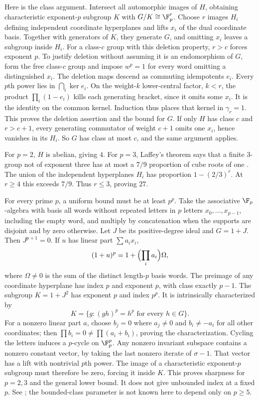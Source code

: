 Here is the class argument. Intersect all automorphic images
of \(H\), obtaining characteristic exponent-\(p\) subgroup
\(K\) with \(G/K\cong\F_p^r\).
Choose \(r\) images \(H_i\) defining independent coordinate
hyperplanes and lifts \(x_i\) of the dual coordinate basis.
Together with generators of \(K\), they generate \(G\), and
omitting \(x_i\) leaves a subgroup inside \(H_i\).
For a class-\(c\) group with this deletion property, \(r>c\)
forces exponent \(p\).
To justify deletion without assuming it is an endomorphism
of \(G\), form the free class-\(c\) group and impose \(w^p=1\)
for every word omitting a distinguished \(x_i\).
The deletion maps descend as commuting idempotents \(e_i\).
Every \(p\)th power lies in \(\bigcap_i\ker e_i\).
On the weight-\(k\) lower-central factor, \(k<r\), the product
\(\prod_i(1-e_i)\) kills each generating bracket, since it
omits some \(x_i\). It is the identity on the common kernel.
Induction thus places that kernel in \(\gamma_r=1\).
This proves the deletion assertion and the bound for \(G\).
If only \(H\) has class \(c\) and \(r>c+1\), every generating
commutator of weight \(c+1\) omits one \(x_i\), hence vanishes
in its \(H_i\). So \(G\) has class at most \(c\), and the same
argument applies.

For \(p=2\), \(H\) is abelian, giving \(4\).
For \(p=3\), Laffey's theorem says that a finite 3-group not
of exponent three has at most a \(7/9\) proportion of cube roots
of one \cite{laffey}.
The union of the independent hyperplanes \(H_i\) has proportion
\(1-(2/3)^r\). At \(r\ge4\) this exceeds \(7/9\).
Thus \(r\le3\), proving \(27\).

For every prime \(p\), a uniform bound must be at least \(p^p\).
Take the associative \(\F_p\)-algebra with basis all words
without repeated letters in \(p\) letters \(x_0,\ldots,x_{p-1}\),
including the empty word, and multiply by concatenation when
the supports are disjoint and by zero otherwise.
Let \(J\) be its positive-degree ideal and \(G=1+J\).
Then \(J^{p+1}=0\). If \(u\) has linear part \(\sum a_ix_i\),
\[
 (1+u)^p=1+\Bigl(\prod_i a_i\Bigr)\Omega,
\]
where \(\Omega\ne0\) is the sum of the distinct length-\(p\)
basis words. The preimage of any coordinate hyperplane
has index \(p\) and exponent \(p\), with class exactly \(p-1\).
The subgroup \(K=1+J^2\) has exponent \(p\) and index \(p^p\).
It is intrinsically characterized by
\[
 K=\{g:(gh)^p=h^p\text{ for every }h\in G\}.
\]
For a nonzero linear part \(a\), choose \(b_j=0\) where
\(a_j\ne0\) and \(b_i\ne-a_i\) for all other coordinates;
then \(\prod b_i=0\ne\prod(a_i+b_i)\), proving the characterization.
Cycling the letters induces a \(p\)-cycle on \(\F_p^p\).
Any nonzero invariant subspace contains a nonzero constant
vector, by taking the last nonzero iterate of \(\sigma-1\).
That vector has a lift with nontrivial \(p\)th power.
The image of a characteristic exponent-\(p\) subgroup must
therefore be zero, forcing it inside \(K\).
This proves sharpness for \(p=2,3\) and the general lower bound.
It does not give unbounded index at a fixed \(p\).
See ; the bounded-class
parameter is not known here to depend only on \(p\ge5\).


